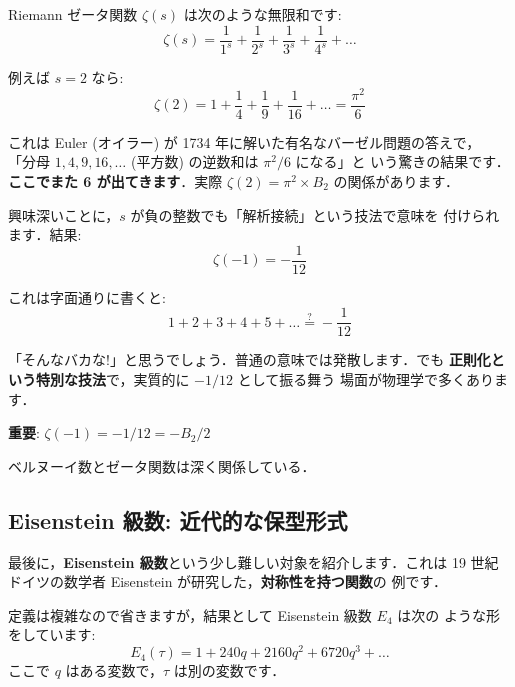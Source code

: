 \documentclass[11pt,a4paper]{article}
\begin{document}
Riemann ゼータ関数 $\zeta(s)$ は次のような無限和です:
\begin{equation*}
\zeta(s) = \frac{1}{1^s} + \frac{1}{2^s} + \frac{1}{3^s} + \frac{1}{4^s} + \ldots
\end{equation*}

例えば $s = 2$ なら:
\begin{equation*}
\zeta(2) = 1 + \frac{1}{4} + \frac{1}{9} + \frac{1}{16} + \ldots = \frac{\pi^2}{6}
\end{equation*}

これは Euler (オイラー) が 1734 年に解いた有名なバーゼル問題の答えで，
「分母 $1, 4, 9, 16, \ldots$ (平方数) の逆数和は $\pi^2/6$ になる」と
いう驚きの結果です．\textbf{ここでまた 6 が出てきます}．実際
$\zeta(2) = \pi^2 \times B_2$ の関係があります．

興味深いことに，$s$ が負の整数でも「解析接続」という技法で意味を
付けられます．結果:
\begin{equation*}
\zeta(-1) = -\frac{1}{12}
\end{equation*}

これは字面通りに書くと:
\begin{equation*}
1 + 2 + 3 + 4 + 5 + \ldots \stackrel{?}{=} -\frac{1}{12}
\end{equation*}

「そんなバカな!」と思うでしょう．普通の意味では発散します．でも
\textbf{正則化という特別な技法}で，実質的に $-1/12$ として振る舞う
場面が物理学で多くあります．

\begin{tcolorbox}[colback=blue!5,colframe=blue!50!black]
\textbf{重要}: $\zeta(-1) = -1/12 = -B_2/2$

ベルヌーイ数とゼータ関数は深く関係している．
\end{tcolorbox}

\subsection{Eisenstein 級数: 近代的な保型形式}

最後に，\textbf{Eisenstein 級数}という少し難しい対象を紹介します．これは
19 世紀ドイツの数学者 Eisenstein が研究した，\textbf{対称性を持つ関数}の
例です．

定義は複雑なので省きますが，結果として Eisenstein 級数 $E_4$ は次の
ような形をしています:
\begin{equation*}
E_4(\tau) = 1 + 240 q + 2160 q^2 + 6720 q^3 + \ldots
\end{equation*}
ここで $q$ はある変数で，$\tau$ は別の変数です．
\end{document}
